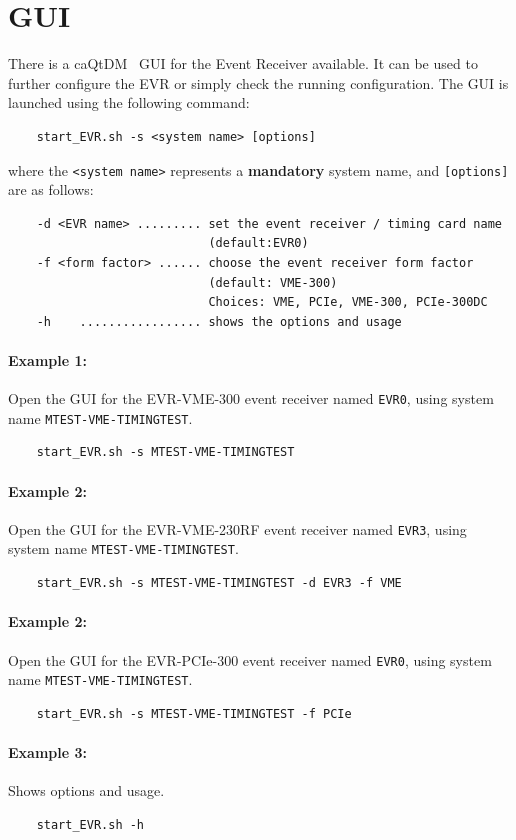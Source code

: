 \documentclass[12pt,a4paper]{article}
\begin{document}
\section{GUI}\label{sec:gui} 
There is a caQtDM~\cite{caqtdm} GUI for the Event Receiver available. It can be used to further configure the EVR or simply check the running configuration. The GUI is launched using the following command:

\begin{verbatim}
	start_EVR.sh -s <system name> [options]
\end{verbatim}
where the \texttt{<system name>} represents a \textbf{mandatory} system name, and \texttt{[options]} are as follows:
\begin{verbatim}
	-d <EVR name> ......... set the event receiver / timing card name 
	                        (default:EVR0)
	-f <form factor> ...... choose the event receiver form factor 
	                        (default: VME-300)
	                        Choices: VME, PCIe, VME-300, PCIe-300DC
	-h    ................. shows the options and usage
\end{verbatim}


\paragraph{Example 1:} Open the GUI for the EVR-VME-300 event receiver named \texttt{EVR0}, using system name \texttt{MTEST-VME-TIMINGTEST}.
\begin{verbatim}
	start_EVR.sh -s MTEST-VME-TIMINGTEST
\end{verbatim}

\paragraph{Example 2:} Open the GUI for the EVR-VME-230RF event receiver named \texttt{EVR3}, using system name \texttt{MTEST-VME-TIMINGTEST}.
\begin{verbatim}
	start_EVR.sh -s MTEST-VME-TIMINGTEST -d EVR3 -f VME
\end{verbatim}

\paragraph{Example 2:} Open the GUI for the EVR-PCIe-300 event receiver named \texttt{EVR0}, using system name \texttt{MTEST-VME-TIMINGTEST}.
\begin{verbatim}
	start_EVR.sh -s MTEST-VME-TIMINGTEST -f PCIe
\end{verbatim}

\paragraph{Example 3:} Shows options and usage.
\begin{verbatim}
	start_EVR.sh -h
\end{verbatim}



\end{document}
